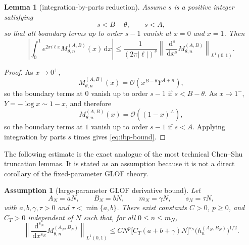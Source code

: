 \documentclass[11pt]{article}
\newtheorem{assumption}{Assumption}
\newtheorem{lemma}{Lemma}
\newcommand{\dd}{\,\mathrm{d}}
\newcommand{\bigo}{\mathcal{O}}
\begin{document}
\begin{lemma}[integration-by-parts reduction]\label{lem:ibp}
Assume $s$ is a positive integer satisfying
\begin{equation}\label{eq:s-condition}
    s<B-\theta,
    \qquad s<A,
\end{equation}
so that all boundary terms up to order $s-1$ vanish at $x=0$ and $x=1$.  Then
\begin{equation}\label{eq:ibp-bound}
    \left|
    \int_0^1e^{2\pi i\ell x}M_{\theta,n}^{(A,B)}(x)\dd x
    \right|
    \le
    \frac{1}{(2\pi |\ell|)^s}
    \left\|\frac{\dd^s}{\dd x^s}M_{\theta,n}^{(A,B)}\right\|_{L^1(0,1)}.
\end{equation}
\end{lemma}

\begin{proof}
As $x\to0^+$,
\[
    M_{\theta,n}^{(A,B)}(x)=\bigo\left(x^{B-\theta}Y^{A+n}\right),
\]
so the boundary terms at $0$ vanish up to order $s-1$ if $s<B-\theta$.  As $x\to1^-$, $Y=-\log x\sim1-x$, and therefore
\[
    M_{\theta,n}^{(A,B)}(x)=\bigo\left((1-x)^A\right),
\]
so the boundary terms at $1$ vanish up to order $s-1$ if $s<A$.  Applying integration by parts $s$ times gives \eqref{eq:ibp-bound}.
\end{proof}

The following estimate is the exact analogue of the most technical Chen--Shu truncation lemmas.  It is stated as an assumption because it is not a direct corollary of the fixed-parameter GLOF theory.

\begin{assumption}[large-parameter GLOF derivative bound]\label{ass:large-derivative}
Let
\begin{equation}\label{eq:linear-params}
    A_N=aN,
    \qquad B_N=bN,
    \qquad m_N=\gamma N,
    \qquad s_N=\tau N,
\end{equation}
with $a,b,\gamma,\tau>0$ and $\tau<\min\{a,b\}$.  There exist constants $C>0$, $p\ge0$, and $C_T>0$ independent of $N$ such that, for all $0\le n\le m_N$,
\begin{equation}\label{eq:large-derivative-bound}
    \left\|\frac{\dd^{s_N}}{\dd x^{s_N}}M_{\theta,n}^{(A_N,B_N)}\right\|_{L^1(0,1)}
    \le
    C N^p\bigl[C_T(a+b+\gamma)N\bigr]^{s_N}
    \bigl(h_n^{(A_N,B_N)}\bigr)^{1/2}.
\end{equation}
\end{assumption}
\end{document}
